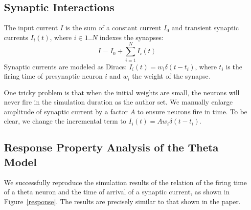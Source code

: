 \subsection{Synaptic Interactions}

The input current $I$ is the sum of a constant current $I_0$ and transient synaptic currents $I_i(t)$, 
where $i \in 1..N$ indexes the synapses:
\begin{equation}
	I = I_0 + \sum_{i=1}^N I_i(t)
\end{equation}
Synaptic currents are modeled as Diracs: $I_i(t) = w_i\delta(t - t_i)$,
where $t_i$ is the firing time of presynaptic neuron $i$ and $w_i$ the weight of the synapse.

One tricky problem is that when the initial weights are small, the neurons will never fire in the simulation duration as the author set. We manually enlarge amplitude of synaptic current by a factor $A$ to ensure neurons fire in time. To be clear, we change the incremental term to $I_i(t) = Aw_i\delta(t - t_i)$.

\subsection{Response Property Analysis of the Theta Model}

We successfully reproduce the simulation results of the relation of the firing time of a theta neuron and the time of arrival of a synaptic current, as shown in Figure~\ref{response}. The results are precisely similar to that shown in the paper.


